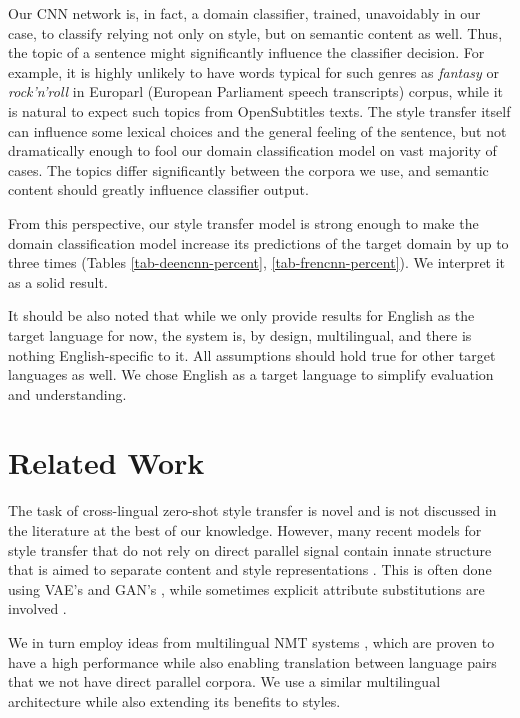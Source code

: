 \documentclass[11pt,a4paper]{article}
\begin{document}
Our CNN network is, in fact, a domain classifier,
trained, unavoidably in our case, to classify relying not only on style, but on semantic content as well. Thus, the topic of a sentence might significantly influence the classifier decision. For example, it is highly unlikely to have words typical for such genres as \textit{fantasy} or \textit{rock'n'roll} in Europarl (European Parliament speech transcripts) corpus, while it is natural to expect such topics from OpenSubtitles texts. The style transfer itself can influence some lexical choices and the general feeling of the sentence, but not dramatically enough to fool our domain classification model on vast majority of cases. The topics differ significantly between the corpora we use, and semantic content should greatly influence classifier output.

From this perspective, our style transfer model is strong enough to make the domain classification model increase its predictions of the target domain by up to three times (Tables \ref{tab-deencnn-percent}, \ref{tab-frencnn-percent}). We interpret it as a solid result.

It should be also noted that while we only provide results for English as the target language for now, the system is, by design, multilingual, and there is nothing English-specific to it. All assumptions should hold true for other target languages as well. We chose English as a target language to simplify evaluation and understanding.

\section{Related Work}
\label{sec:related-work}

The task of cross-lingual zero-shot style transfer is novel and is not discussed in the literature at the best of our knowledge. However, many recent models for style transfer that do not rely on direct parallel signal contain innate structure that is aimed to separate content and style representations \cite{gvae-1, gvae-2, gvae-3}. This is often done using VAE's \cite{vae} and GAN's \cite{GAN}, while sometimes explicit attribute substitutions are involved \cite{manual}.

We in turn employ ideas from multilingual NMT systems \cite{multiling-multiway, multiling-goolge}, which are proven to have a high performance while also enabling translation between language pairs that we not have direct parallel corpora. We use a similar multilingual architecture while also extending its benefits to styles. 
\end{document}
